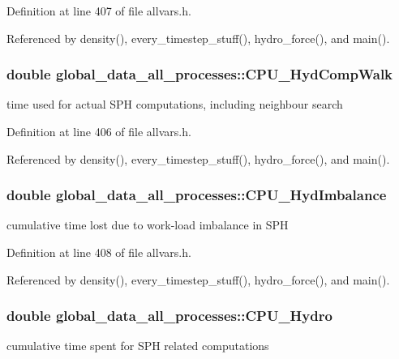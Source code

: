 Definition at line 407 of file allvars.h.



Referenced by density(), every\_\-timestep\_\-stuff(), hydro\_\-force(), and main().

\hypertarget{structglobal__data__all__processes_a918e3d80cf4fdaf22a803f4014588ad4}{
\subsubsection[{CPU\_\-HydCompWalk}]{\setlength{\rightskip}{0pt plus 5cm}double {\bf global\_\-data\_\-all\_\-processes::CPU\_\-HydCompWalk}}}
\label{structglobal__data__all__processes_a918e3d80cf4fdaf22a803f4014588ad4}
time used for actual SPH computations, including neighbour search 

Definition at line 406 of file allvars.h.



Referenced by density(), every\_\-timestep\_\-stuff(), hydro\_\-force(), and main().

\hypertarget{structglobal__data__all__processes_a848f914dfb3ae24d6faedc1944bcb265}{
\subsubsection[{CPU\_\-HydImbalance}]{\setlength{\rightskip}{0pt plus 5cm}double {\bf global\_\-data\_\-all\_\-processes::CPU\_\-HydImbalance}}}
\label{structglobal__data__all__processes_a848f914dfb3ae24d6faedc1944bcb265}
cumulative time lost due to work-\/load imbalance in SPH 

Definition at line 408 of file allvars.h.



Referenced by density(), every\_\-timestep\_\-stuff(), hydro\_\-force(), and main().

\hypertarget{structglobal__data__all__processes_add20a8e70f3c4cc7912dc81ef141daa2}{
\subsubsection[{CPU\_\-Hydro}]{\setlength{\rightskip}{0pt plus 5cm}double {\bf global\_\-data\_\-all\_\-processes::CPU\_\-Hydro}}}
\label{structglobal__data__all__processes_add20a8e70f3c4cc7912dc81ef141daa2}
cumulative time spent for SPH related computations 


